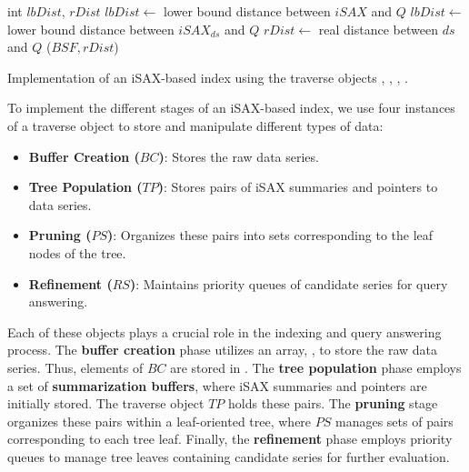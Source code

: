 \begin{algorithm}[htbp]
\begin{algorithmic}[1]
    \vspace*{1mm}
        \State int $\mathit{lbDist}$, $\mathit{rDist}$
        \State $\mathit{lbDist} \gets$ lower bound distance between $\mathit{iSAX}$ and $Q$
                \State $\mathit{lbDist} \gets$ lower bound distance between $\mathit{iSAX_{ds}}$ and $Q$
                    \State $\mathit{rDist} \gets$ real distance between $\mathit{ds}$ and $Q$
                        \State *\UpdateBSF($\mathit{BSF},\mathit{rDist}$) 
                    \EndIf
                \EndIf
            \EndFor
            \Return \True
        \Else
            \Return \False
        \EndIf
    \EndProcedure
    
    \end{algorithmic}
    
    \caption{Implementation of an iSAX-based index using the traverse objects \BC, \TP, \PS, \RS.}
    \label{alg:iSAXTraverse}
    \end{algorithm}
    
    


To implement the different stages of an iSAX-based index, we use four instances of a traverse object 
to store and manipulate different types of data:

\begin{itemize}
    \item \textbf{Buffer Creation ($BC$)}: Stores the raw data series.
    \item \textbf{Tree Population ($TP$)}: Stores pairs of iSAX summaries and
     pointers to data series.
    \item \textbf{Pruning ($PS$)}: Organizes these pairs into sets corresponding
     to the leaf nodes of the tree.
    \item \textbf{Refinement ($RS$)}: Maintains priority queues of candidate
     series for query answering.
\end{itemize}

Each of these objects plays a crucial role in the indexing and query answering
process. The \textbf{buffer creation} phase utilizes an array, \RawData, to 
store the raw data series. Thus, elements of $BC$ are stored in \RawData. 
The \textbf{tree population} phase employs a set of \textbf{summarization buffers},
where iSAX summaries and pointers are initially stored. The traverse object $TP$
holds these pairs. The \textbf{pruning} stage organizes these pairs within a
leaf-oriented tree, where $PS$ manages sets of pairs corresponding to each tree leaf. 
Finally, the \textbf{refinement} phase employs priority queues to manage tree
leaves containing candidate series for further evaluation.

